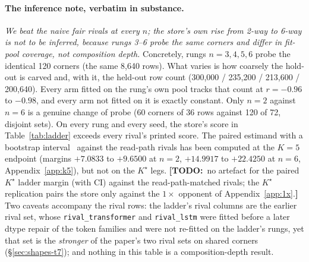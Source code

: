 \documentclass{article} %
\newcommand{\TODO}[1]{{\color{orange}\textbf{[TODO:}~#1\textbf{]}}}
\newcommand{\Kstar}{\ensuremath{K^{\star}}}
\begin{document}
\paragraph{The inference note, verbatim in substance.} \emph{We beat the naive fair rivals at
every $n$; the store's own rise from 2-way to 6-way is not to be inferred, because rungs 3--6
probe the same corners and differ in fit-pool coverage, not composition depth.} Concretely,
rungs $n=3,4,5,6$ probe the identical 120 corners (the same 8,640 rows). What varies is how
coarsely the hold-out is carved and, with it, the held-out row count (300,000 / 235,200 /
213,600 / 200,640). Every arm fitted on the rung's own pool tracks that count at
$r=-0.96$ to $-0.98$, and every arm not fitted on it is exactly constant.
Only $n=2$ against $n=6$ is a genuine change of probe (60 corners of 36 rows against 120 of
72, disjoint sets). %
On every rung and every seed, the store's score in Table~\ref{tab:ladder} exceeds every
rival's printed score. The paired estimand with a bootstrap interval~\citep{efron1979bootstrap} against the read-path
rivals has been computed at the $K=5$ endpoint (margins $+7.0833$ to $+9.6500$ at $n=2$,
$+14.9917$ to $+22.4250$ at $n=6$, Appendix~\ref{app:k5}), but not on the $\Kstar$ legs.
\TODO{no artefact for the paired $\Kstar$ ladder margin (with CI) against the read-path-matched
rivals; the $\Kstar$ replication pairs the store only against the $1\times$ opponent of
Appendix~\ref{app:1x}.}
Two caveats accompany the rival rows: the ladder's rival columns are the earlier rival set,
whose \texttt{rival\_transformer} and \texttt{rival\_lstm} were fitted before a later dtype repair of
the token families and were not re-fitted on the ladder's rungs, yet that set is the
\emph{stronger} of the paper's two rival sets on shared corners (\S\ref{sec:shapes-t7}); and
nothing in this table is a composition-depth result.
\end{document}
